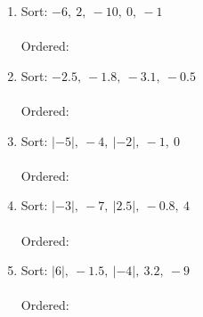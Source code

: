\documentclass[12pt, letterpaper, fleqn]{article}
\newcommand{\blanklong}{\underline{\hspace{6.5cm}}}
\begin{document}
\begin{enumerate}[itemsep=1cm, leftmargin=0.6cm]

\item Sort: $-6, \ 2, \ -10, \ 0, \ -1$ \\  \\
Ordered: \blanklong

\vspace{1cm}

\item Sort: $-2.5, \ -1.8, \ -3.1, \ -0.5$ \\ \\
Ordered: \blanklong

\vspace{1cm}

\item Sort: $|-5|, \ -4, \ |-2|, \ -1, \ 0$ \\ \\
Ordered: \blanklong

\vspace{1cm}

\item Sort: $|-3|, \ -7, \ |2.5|, \ -0.8, \ 4$ \\ \\
Ordered: \blanklong
\vspace{1cm}

\item Sort: $|6|, \ -1.5, \ |-4|, \ 3.2, \ -9$ \\ \\
Ordered: \blanklong
\vspace{1cm}

\end{enumerate}
\end{document}
